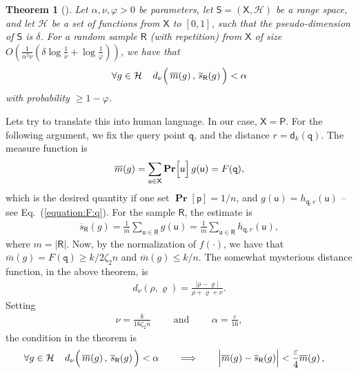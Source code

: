 \documentclass[12pt]{article}
\newtheorem{theorem}{Theorem}[section] \newtheorem{lemma}[theorem]{Lemma}
\theoremstyle{remark}{\theorembodyfont{\rm} \newtheorem{remark}[theorem]{Remark}}
\newcommand{\thmlab}[1]{{\label{theo:#1}}}
\newcommand{\eqlab}[1]{\label{equation:#1}}
\newcommand{\Eqref}[1]{Eq.~(\ref{equation:#1})}
\newcommand{\MakeBig}{\rule[-.2cm]{0cm}{0.4cm}}
\newcommand{\MakeSBig}{\rule[0.0cm]{0.0cm}{0.35cm}} \newcommand{\brc}[1]{\left\{ {#1} \right\}}
\newcommand{\pth}[2][\!]{#1\left({#2}\right)}
\newcommand{\cardin}[1]{\left\lvert {#1} \right\rvert}
\newcommand{\eps}{{\varepsilon}}\newcommand{\divides}{|}
\newcommand{\PntSet}{\mathsf{P}}
\newcommand{\query}{\mathtt{q}}
\newcommand{\pnt} {\mathsf{p}}
\newcommand{\pntA}{\mathsf{u}}
\newcommand{\ds}{\displaystyle}
\newcommand{\constC}{\zeta_2}
\newcommand{\Family}{\mathcal{H}}\newcommand{\dhalf}[2][\!]{\mathsf{d}_{n/2}\pth[#1]{#2}}
\newcommand{\dk}[2][\!]{\mathsf{d}_{k}\pth[#1]{#2}}
\newcommand{\BadProb}{\varphi}
\newcommand{\RangeSpace}{\mathsf{S}}
\newcommand{\GroundSet}{\textsf{X}}\newcommand{\pbrcS}[1]{\left[ {#1} \right]}
\newcommand{\Dim}{\delta}\newcommand{\Set}{N}
\newcommand{\DistX}[2]{d_{#1}\pth{#2}}
\newcommand{\MeasureChar}{\overline{m}}
\newcommand{\Measure}[1]{\MeasureChar\pth{#1}}
\newcommand{\sMeasureX}[2]{\overline{s}_{#2}\pth{#1}}
\newcommand{\pbrcx}[1]{\left[ {#1} \right]}
\newcommand{\Prob}[1]{\mathop{\mathbf{Pr}}\!\pbrcx{#1}}
\newcommand{\RSample}{\mathsf{R}}
\begin{document}
\begin{theorem}[\cite{lls-ibscl-01}]
    \thmlab{SAMPLING}Let $\alpha, \nu, \BadProb > 0$ be parameters, let $\RangeSpace =
    \pth{\GroundSet, \Family}$ be a range space, and let $\Family$ be
    a set of functions from $\GroundSet$ to $\pbrcS{0,1}$, such that
    the pseudo-dimension of $\RangeSpace$ is $\Dim$.  For a random
    sample  $\RSample$ (with repetition) from
    $\GroundSet$ of size $\ds O\pth{\frac{1}{\alpha^2 \nu} \pth{ \Dim
          \log \frac{1}{\nu} + \log \frac{1}{\BadProb}}}$, we have
    that
    \[
    \forall g \in \Family \;\;\;\; \DistX{\nu}{\,\Measure{g}, \,
       \sMeasureX{g}{\RSample} \MakeSBig } < \alpha
    \]
    with probability $\geq 1-\BadProb$.
\end{theorem}

Lets try to translate this into human language. In our case,
$\GroundSet = \PntSet$. For the following argument, we fix the query
point $\query$, and the distance $r=\dk{\query}$.  The measure
function is
\begin{align*}
    \Measure{g} = \sum_{\pntA \in \GroundSet} \Prob{\pntA\MakeBig}
    g(\pntA) = F(\query),
\end{align*}
which is the desired quantity if one set $\Prob{\pnt} = 1/n$, and
$g(\pntA) = h_{\query,r}\pth{ \pntA }$ -- see \Eqref{F:q}.  For the
sample $\RSample $, the estimate is
\begin{align*}
    \sMeasureX{g}{\RSample}=\frac{1}{m} \sum_{\pntA \in \RSample} g\pth{\pntA}=\frac{1}{m} \sum_{\pntA \in \RSample} h_{\query,r}\pth{ \pntA },
\end{align*}
where $m=\cardin{\RSample}$.  Now, by the normalization of $f(\cdot)$,
we have that $\Measure{g} = F(\query) \geq k/2\constC n$ and
$\Measure{g} \leq k/n$.  The somewhat mysterious distance function, in
the above theorem, is
\begin{align*}
    \DistX{\nu}{ \rho, \varrho} = \frac{\cardin{\rho-\varrho}}{\rho+
       \varrho+ \nu}.
\end{align*}
Setting 
\begin{align}\eqlab{parameter:setting}\nu = \tfrac{k}{16 \constC n}\qquad \text{ and }\qquad \alpha = \tfrac{\eps}{16},
\end{align}
the condition in the theorem is
\begin{align}\eqlab{amazing}& \forall g \in \Family \;\;\;\; \DistX{\nu}{ \MakeBig
       \,\Measure{g}, \, \sMeasureX{g}{\RSample} \MakeSBig } < \alpha
\qquad \Longrightarrow \qquad \cardin{\MakeBig \Measure{g} - \sMeasureX{g}{\RSample} }<\frac{\eps}{4} \Measure{g},
\end{align}
\end{document}
